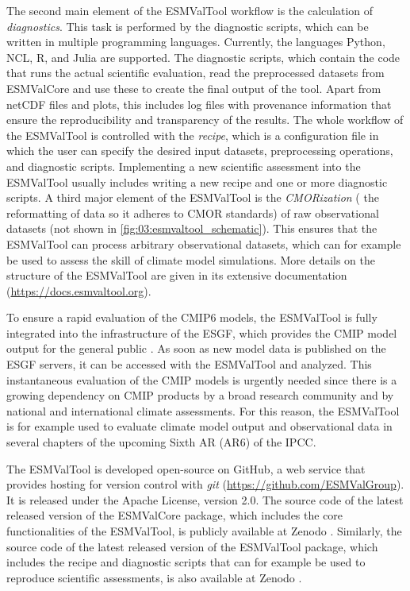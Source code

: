 The second main element of the \ac{ESMValTool} workflow is the calculation of
\emph{diagnostics}. This task is performed by the diagnostic scripts, which can
be written in multiple programming languages. Currently, the languages Python,
NCL, R, and Julia are supported. The diagnostic scripts, which contain the code
that runs the actual scientific evaluation, read the preprocessed datasets from
\ac{ESMValCore} and use these to create the final output of the tool. Apart
from \ac{netCDF} files and plots, this includes log files with provenance
information that ensure the reproducibility and transparency of the results.
The whole workflow of the \ac{ESMValTool} is controlled with the \emph{recipe},
which is a configuration file in which the user can specify the desired input
datasets, preprocessing operations, and diagnostic scripts. Implementing a new
scientific assessment into the \ac{ESMValTool} usually includes writing a new
recipe and one or more diagnostic scripts. A third major element of the
\ac{ESMValTool} is the \emph{\ac{CMOR}ization} (\ie{} the reformatting of data
so it adheres to \ac{CMOR} standards) of raw observational datasets (not shown
in \cref{fig:03:esmvaltool_schematic}). This ensures that the \ac{ESMValTool}
can process arbitrary observational datasets, which can for example be used to
assess the skill of climate model simulations. More details on the structure of
the \ac{ESMValTool} are given in its extensive documentation
(\url{https://docs.esmvaltool.org}).

To ensure a rapid evaluation of the \acs{CMIP}6 models, the \ac{ESMValTool} is
fully integrated into the infrastructure of the \ac{ESGF}, which provides the
\ac{CMIP} model output for the general public \autocite{Eyring2016b}. As soon
as new model data is published on the \ac{ESGF} servers, it can be accessed
with the \ac{ESMValTool} and analyzed. This instantaneous evaluation of the
\ac{CMIP} models is urgently needed since there is a growing dependency on
\ac{CMIP} products by a broad research community and by national and
international climate assessments. For this reason, the \ac{ESMValTool} is for
example used to evaluate climate model output and observational data in several
chapters of the upcoming Sixth \acl{AR} (\acs{AR}6) of the \ac{IPCC}.

The \ac{ESMValTool} is developed open-source on GitHub, a web service that
provides hosting for version control with \emph{git}
(\url{https://github.com/ESMValGroup}). It is released under the Apache
License, version 2.0. The source code of the latest released version of the
\ac{ESMValCore} package, which includes the core functionalities of the
\ac{ESMValTool}, is publicly available at Zenodo \autocite{Andela2020a}.
Similarly, the source code of the latest released version of the
\ac{ESMValTool} package, which includes the recipe and diagnostic scripts that
can for example be used to reproduce scientific assessments, is also available
at Zenodo \autocite{Andela2020}.


